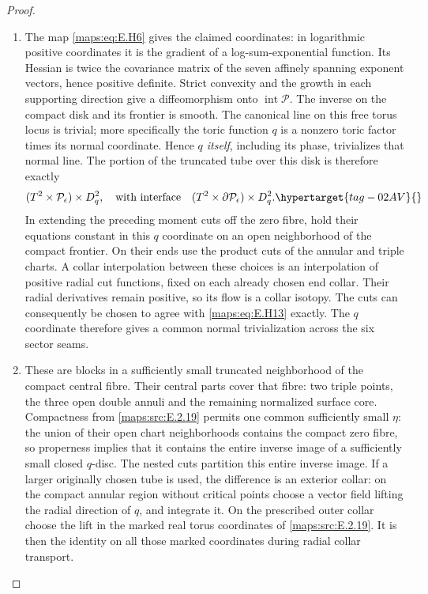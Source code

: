\documentclass[11pt,a4paper]{article}
\numberwithin{equation}{section}
\theoremstyle{definition}
\begin{document}
\begin{proof}
\begin{enumerate}[label=\arabic*.,leftmargin=*]
\item The map \eqref{maps:eq:E.H6} gives the claimed coordinates: in logarithmic
positive coordinates it is the gradient of a log-sum-exponential
function.  Its Hessian is twice the covariance matrix of the
seven affinely spanning exponent vectors, hence positive
definite.  Strict convexity and the growth in each supporting
direction give a diffeomorphism onto
$\operatorname{int}\mathcal P$.  The inverse on the compact
disk and its frontier is smooth.  The canonical line on this
free torus locus is trivial; more specifically the toric
function $q$ is a nonzero toric factor times its normal
coordinate.  Hence \emph{$q$ itself}, including its phase,
trivializes that normal line.  The portion of the truncated
tube over this disk is therefore exactly
\begin{equation}
 (T^2\times\mathcal P_\epsilon)\times D^2_q,
 \quad\hbox{with interface}\quad
 (T^2\times\partial\mathcal P_\epsilon)\times D^2_q.
 \hypertarget{tag-02AV}{}\label{maps:eq:E.H13}
\end{equation}
In extending the preceding moment cuts off the zero fibre,
hold their equations constant in this $q$ coordinate on an
open neighborhood of the compact frontier.  On their ends
use the product cuts of the annular and triple charts.  A
collar interpolation between these choices is an interpolation
of positive radial cut functions, fixed on each already chosen
end collar.  Their radial derivatives remain positive, so its
flow is a collar isotopy.  The cuts can consequently be chosen
to agree with \eqref{maps:eq:E.H13} exactly.  The $q$ coordinate therefore gives a common normal trivialization across the six sector seams.

\item These are blocks in a sufficiently small truncated
neighborhood of the compact central fibre.  Their central
parts cover that fibre: two triple points, the three open
double annuli and the remaining normalized surface core.
Compactness from \ref{maps:src:E.2.19} permits one common sufficiently small
$\eta$: the union of their open chart neighborhoods contains
the compact zero fibre, so properness implies that it contains
the entire inverse image of a sufficiently small closed
$q$-disc.  The nested cuts partition this entire inverse image.
If a larger originally chosen tube is used, the
difference is an exterior collar: on the compact annular
region without critical points choose a vector field lifting
the radial direction of $q$, and integrate it.  On the
prescribed outer collar choose the lift in the marked real
torus coordinates of \ref{maps:src:E.2.19}.  It is then the identity on all
those marked coordinates during radial collar transport.



\end{enumerate}
\end{proof}
\end{document}
